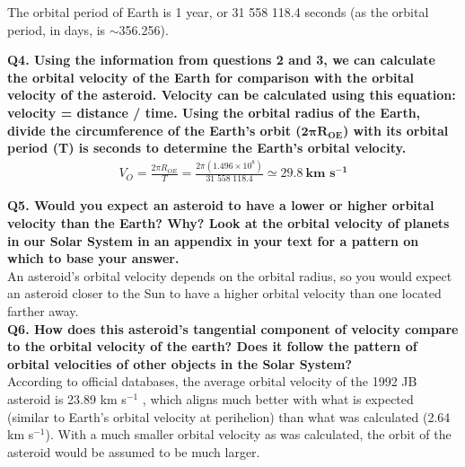 \documentclass[12pt]{article}
\begin{document}
The orbital period of Earth is 1 year, or 31 558 118.4 seconds (as the orbital period, in days, is $\sim$356.256).

\textbf{Q4. Using the information from questions 2 and 3, we can calculate the orbital velocity of the Earth for comparison with the orbital velocity of the asteroid. Velocity can be calculated using this equation: velocity = distance / time.
Using the orbital radius of the Earth, divide the circumference of the Earth's orbit ($\mathbf{2 \pi R_{OE}}$) with its orbital period (T) is seconds to determine the Earth's orbital velocity.} \\

\begin{gather*}
    V_O = \frac{2 \pi R_{OE}}{T} = \frac{2 \pi (1.496 \times 10^{8})}{31 \; 558 \; 118.4} \simeq \mathbf{29.8} \: \textbf{km s} \mathbf{^{-1}}
\end{gather*}

\textbf{Q5. Would you expect an asteroid to have a lower or higher orbital velocity than the Earth? Why? Look at the orbital velocity of planets in our Solar System in an appendix in your text for a pattern on which to base your answer.}\\

An asteroid's orbital velocity depends on the orbital radius, so you would expect an asteroid closer to the Sun to have a higher orbital velocity than one located farther away. \\

\textbf{Q6. How does this asteroid's tangential component of velocity compare to the orbital velocity of the earth? Does it follow the pattern of orbital velocities of other objects in the Solar System?}\\

According to official databases, the average orbital velocity of the 1992 JB asteroid is 23.89 km s$^{-1}$ \cite{1992jb}, which aligns much better with what is expected (similar to Earth's orbital velocity at perihelion) than what was calculated (2.64 km s$^{-1}$). With a much smaller orbital velocity as was calculated, the orbit of the asteroid would be
assumed to be much larger.
\end{document}
